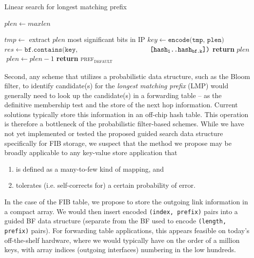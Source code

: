 \documentclass[conference,compsoc]{IEEEtran}
\begin{document}
\begin{algorithm}
\caption{Linear search for longest matching prefix}\label{alg:linearsearch}
\begin{algorithmic}[1]
\State $plen \gets maxlen$

  \State $tmp \gets$ extract $plen$ most significant bits in IP
  \State $key \gets \texttt{encode(tmp, plen)}$
  \State $res \gets \texttt{bf.contains(key,}$
                \State $\hspace*{36mm} \texttt{[hash\textsubscript{1}..hash\textsubscript{bf.k}])}$
      \State \textbf{return} $plen$
  \Else
    $\;plen \gets plen - 1$
  \EndIf
\EndWhile
\State \textbf{return} \textsc{pref\textsubscript{default}}
\EndProcedure
\end{algorithmic}
\end{algorithm}


Second, any scheme that utilizes a probabilistic data structure, such as
the Bloom filter, to identify candidate(s) for the \emph{longest matching
prefix} (LMP) would generally need to look up the candidate(s)
in a forwarding table -- as the definitive membership
test and the store of the next hop information. Current solutions typically
store this information in an off-chip hash table. This operation is therefore
a bottleneck of the probabilistic filter-based schemes. While we have
not yet implemented or tested the proposed guided search data structure
specifically for FIB storage, we suspect that the method we propose may be broadly
applicable to any key-value store application that

\begin{enumerate}[label=(\alph*)]
\item is defined as a many-to-few kind of mapping, and
\item tolerates (i.e. self-corrects for) a certain probability of error.
\end{enumerate}

In the case of the FIB table, we propose to store the outgoing link information
in a compact array. We would then insert encoded \texttt{(index, prefix)} pairs
into a guided BF data structure (separate from the BF used to
encode \texttt{(length, prefix)} pairs). For forwarding table applications, this appears 
feasible on today's off-the-shelf hardware, where we would typically have 
on the order of a
million keys, with array indices (outgoing interfaces) numbering in the low 
hundreds.
\end{document}
